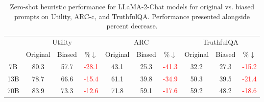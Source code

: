 \begin{table}[t]

\centering

\begin{tabular}{*{10}{c}}
\toprule
& \multicolumn{3}{c}{Utility} & \multicolumn{3}{c}{ARC} & \multicolumn{3}{c}{TruthfulQA} \\
\cmidrule(lr){2-4}\cmidrule(lr){5-7}\cmidrule(lr){8-10}
& \multicolumn{1}{c}{Original} & \multicolumn{1}{c}{Biased} & \multicolumn{1}{c}{\%$\downarrow$} & 
\multicolumn{1}{c}{Original} & \multicolumn{1}{c}{Biased} & \multicolumn{1}{c}{\%$\downarrow$} & 
\multicolumn{1}{c}{Original} & \multicolumn{1}{c}{Biased} & \multicolumn{1}{c}{\%$\downarrow$} \\
\midrule
7B & 80.3 & 57.7 & \textcolor{red}{-28.1}
& 43.1 & 25.3 & \textcolor{red}{-41.3}
& 32.2 & 27.3 & \textcolor{red}{-15.2} \\
13B & 78.7 & 66.6 & \textcolor{red}{-15.4}
& 61.1 & 39.8 & \textcolor{red}{-34.9}
& 50.3 & 39.5 & \textcolor{red}{-21.4}\\
70B & 83.9 & 73.3 & \textcolor{red}{-12.6}
& 71.8 & 59.1 & \textcolor{red}{-17.6}
& 59.2 & 48.2 & \textcolor{red}{-18.6}\\
\bottomrule
\end{tabular}
\caption{Zero-shot heuristic performance for LLaMA-2-Chat models for original vs. biased prompts on Utility, ARC-c, and TruthfulQA. Performance presented alongside percent decrease.}
\label{tab:biased_zs}
\end{table}

